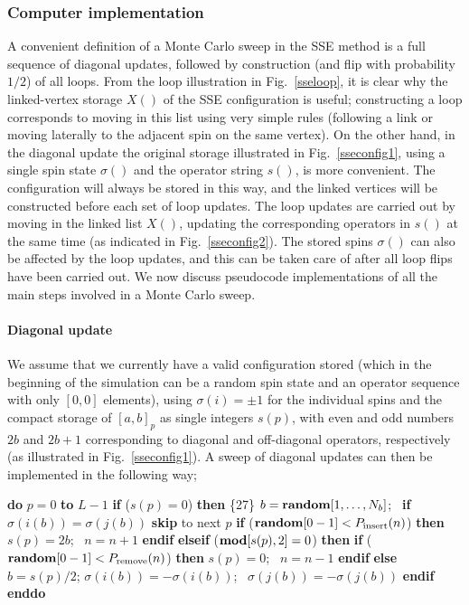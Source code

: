 \documentclass[draft,numberedheadings]{aipproc}
\newcommand{\code}{\null\vskip-2mm\noindent}
\newcommand{\br}{\hfill\break}
\newcommand{\cia}{\null\hskip5mm}
\newcommand{\cib}{\null\hskip10mm}
\newcommand{\cic}{\null\hskip15mm}
\begin{document}
\subsubsection{Computer implementation}

A convenient definition of a Monte Carlo sweep in the SSE method is a full sequence of diagonal updates, followed by construction (and flip with probability $1/2$)
of all loops. From the loop illustration  in Fig.~\ref{sseloop}, it is clear why the linked-vertex storage $X()$ of the SSE configuration is useful; constructing 
a loop corresponds to moving in this list using very simple rules (following a link or moving laterally to the adjacent spin on the same vertex). On the other hand, 
in the diagonal update the original storage illustrated in Fig.~\ref{sseconfig1}, using a single spin state $\sigma()$ and the operator string $s()$, is more convenient. 
The configuration will always be stored in this way, and the linked vertices will be constructed before each set of loop updates. The loop updates are carried out 
by moving in the linked list $X()$, updating the corresponding operators in $s()$ at the same time (as indicated in Fig.~\ref{sseconfig2}). The stored spins $\sigma()$ 
can also be affected by the loop updates, and this can be taken care of after all loop flips have been carried out. We now discuss pseudocode implementations of 
all the main steps involved in a Monte Carlo sweep.

\paragraph{Diagonal update}

We assume that we currently have a valid configuration stored (which in the beginning of the simulation can be a random spin state and an operator
sequence with only $[0,0]$ elements), using $\sigma(i)=\pm 1$ for the individual spins and the compact storage of $[a,b]_p$ as single integers $s(p)$, 
with even and odd numbers $2b$ and $2b+1$ corresponding to diagonal and off-diagonal operators, respectively (as illustrated in Fig.~\ref{sseconfig1}). 
A sweep of diagonal updates can then be implemented in the following way;

{\code
\cia       {\bf do} $p=0$ {\bf to} $L-1$ \br
\cib          {\bf if} ($s(p)=0$) {\bf then}     \hfill \{27\} \break
\cic              $b={\bf random}[1,\ldots,N_b]$;~ {\bf if } $\sigma(i(b))=\sigma(j(b))$ {\bf skip} {\rm to next} $p$ \br
\cic              {\bf if} (${\bf random}[0-1]<P_{\rm insert}(n)$) {\bf then} $s(p)=2b$;~ $n=n+1$ {\bf endif}  \br
\cib          {\bf elseif} (${\bf mod}[s(p),2]=0$) {\bf then} \br
\cic              {\bf if} (${\bf random}[0-1]<P_{\rm remove}(n)$) {\bf then} $s(p)=0$;~ $n=n-1$ {\bf endif}  \br 
\cib          {\bf else} \br
\cic              $b=s(p)/2$; $\sigma(i(b))=-\sigma(i(b))$;~ $\sigma(j(b))=-\sigma(j(b))$ \br
\cib          {\bf endif} \br
\cia       {\bf enddo} 
\code}
\end{document}
